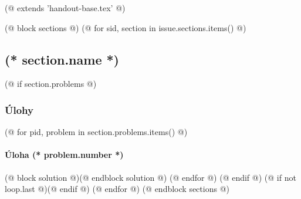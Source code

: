 (@ extends 'handout-base.tex' @)

(@ block sections @)
    (@ for sid, section in issue.sections.items() @)
        \subsection{(* section.name *)}
        (@ if section.problems @)
            \subsubsection{Úlohy}
            (@ for pid, problem in section.problems.items() @)
                \paragraph{Úloha (* problem.number *)}
                (@ block solution @)(@ endblock solution @)
            (@ endfor @)
        (@ endif @)
        (@ if not loop.last @)\newpage(@ endif @)
    (@ endfor @)
(@ endblock sections @)
